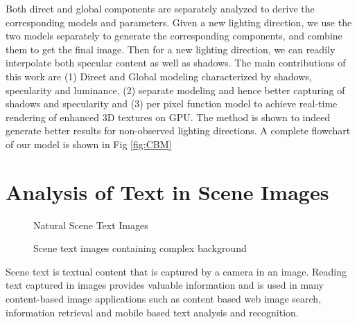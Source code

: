 Both direct and global components are separately analyzed to derive the
corresponding models and parameters. Given a new lighting direction, we use the
two models separately to generate the corresponding components, and combine them
to get the final image. Then for a new lighting direction, we can readily
interpolate both specular content as well as shadows.
The main contributions of this work are (1) Direct and Global modeling characterized by
shadows, specularity and luminance,
(2) separate modeling and hence better capturing of shadows and specularity
and (3) per pixel function model to
achieve real-time rendering of enhanced 3D textures on GPU.
The method is shown to indeed
generate better results for non-observed lighting directions.
A complete flowchart of our model is shown in Fig \ref{fig:CBM}


\section{Analysis of Text in Scene Images}
\begin{figure}[t]
\centering
{}
\caption
{Natural Scene Text Images}
\label{fig:scenetext}
\end{figure}
\begin{figure}[t]
\centering
{}
\caption
{Scene text images containing complex background}
\label{fig:textchallenge}
\end{figure}

Scene text is textual content that is captured by a camera in an image.
Reading text captured in images provides valuable information and is
used in many content-based image
applications such as content based web image search,
information retrieval and mobile based text analysis
and recognition.

